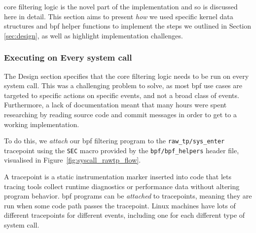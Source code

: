 \afg core filtering logic is the novel part of the implementation and so is
discussed here in detail. This section aims to present \textit{how} we used
specific kernel data structures and \ac{bpf} helper functions to implement the
steps we outlined in Section \ref{sec:design}, as well as highlight
implementation challenges.

\subsubsection{Executing on Every system call}

The Design section specifies that the core filtering logic needs to be run on
every system call. This was a challenging problem to solve, as most \ac{bpf}
use cases are targeted to specific actions on specific events, and not a broad
class of events. Furthermore, a lack of documentation meant that many hours were
spent researching by reading source code and commit messages in order to get to
a working implementation.

To do this, we \textit{attach} our \ac{bpf} filtering program to
the \texttt{raw\_tp/sys\_enter} tracepoint using the \texttt{SEC} macro provided
by the \texttt{bpf/bpf\_helpers} header file, visualised in Figure~\ref{fig:syscall_rawtp_flow}.

A tracepoint is a static instrumentation marker inserted into code that lets tracing 
tools collect runtime diagnostics or performance data without altering program 
behavior. \ac{bpf} programs can be \textit{attached} to tracepoints, meaning they 
are run when some code path passes the tracepoint. Linux machines have lots of 
different tracepoints for different events, including one for each different type of 
system call. 

